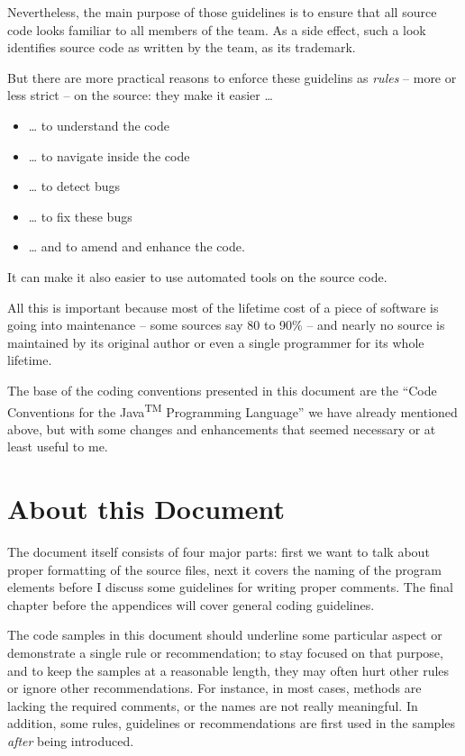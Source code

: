 Nevertheless, the main purpose of those guidelines is to ensure that all source code looks familiar to all members of the team. As a side effect, such a look identifies source code as written by the team, as its trademark.

But there are more practical reasons to enforce these guidelins as \textit{rules} – more or less strict – on the source: they make it easier …
\begin{itemize}[nosep]
\item … to understand the code
\item … to navigate inside the code
\item … to detect bugs
\item … to fix these bugs
\item … and to amend and enhance the code.
\end{itemize}

It can make it also easier to use automated tools on the source code.

All this is important because most of the lifetime cost of a piece of software is going into maintenance – some sources say 80 to 90\% – and nearly no source is maintained by its original author or even a single programmer for its whole lifetime.

The base of the coding conventions presented in this document are the “Code Conventions for the Java\textsuperscript{TM} Programming Language” \autocite{SUN_CODE_CONVENTIONS} we have already mentioned above, but with some changes and enhancements that seemed necessary or at least useful to me.

\section{About this Document}
The document itself consists of four major parts: first we want to talk about proper formatting of the source files, next it covers the naming of the program elements before I discuss some guidelines for writing proper comments. The final chapter before the appendices will cover general coding guidelines.

The code samples in this document should underline some particular aspect or demonstrate a single rule or recommendation; to stay focused on that purpose, and to keep the samples at a reasonable length, they may often hurt other rules or ignore other recommendations. For instance, in most cases, methods are lacking the required comments, or the names are not really meaningful. In addition, some rules, guidelines or recommendations are first used in the samples \textit{after} being introduced.

